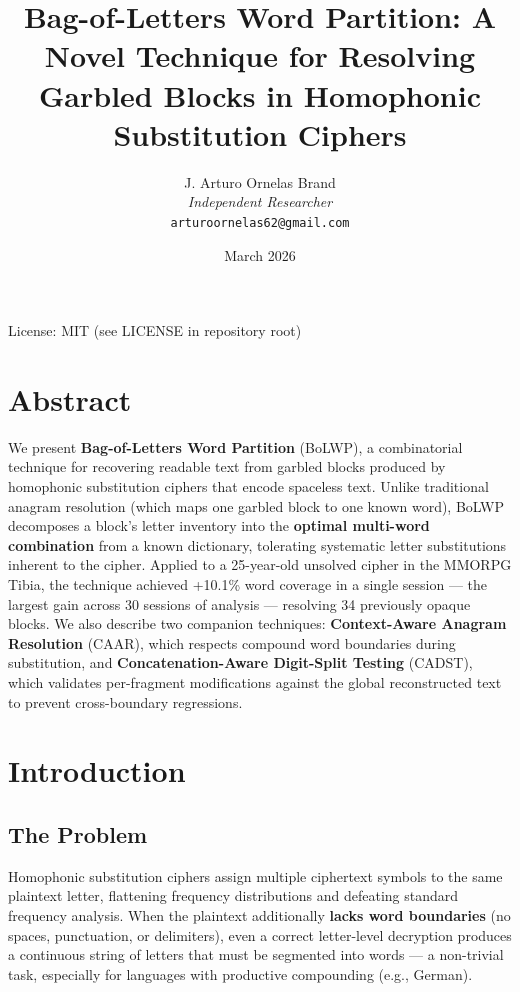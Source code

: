 \documentclass[11pt,a4paper]{article}
\title{Bag-of-Letters Word Partition: A Novel Technique for Resolving Garbled Blocks in Homophonic Substitution Ciphers}
\author{
    J. Arturo Ornelas Brand \\
    \textit{Independent Researcher} \\
    \texttt{arturoornelas62@gmail.com}
}
\date{March 2026}
\begin{document}
\maketitle

\begin{center}
License: MIT (see LICENSE in repository root)
\end{center}

\tableofcontents
\newpage

\section{Abstract}

We present \textbf{Bag-of-Letters Word Partition} (BoLWP), a combinatorial technique for recovering readable text from garbled blocks produced by homophonic substitution ciphers that encode spaceless text. Unlike traditional anagram resolution (which maps one garbled block to one known word), BoLWP decomposes a block's letter inventory into the \textbf{optimal multi-word combination} from a known dictionary, tolerating systematic letter substitutions inherent to the cipher. Applied to a 25-year-old unsolved cipher in the MMORPG Tibia, the technique achieved +10.1\% word coverage in a single session --- the largest gain across 30 sessions of analysis --- resolving 34 previously opaque blocks. We also describe two companion techniques: \textbf{Context-Aware Anagram Resolution} (CAAR), which respects compound word boundaries during substitution, and \textbf{Concatenation-Aware Digit-Split Testing} (CADST), which validates per-fragment modifications against the global reconstructed text to prevent cross-boundary regressions.

\section{Introduction}

\subsection{The Problem}

Homophonic substitution ciphers assign multiple ciphertext symbols to the same plaintext letter, flattening frequency distributions and defeating standard frequency analysis. When the plaintext additionally \textbf{lacks word boundaries} (no spaces, punctuation, or delimiters), even a correct letter-level decryption produces a continuous string of letters that must be segmented into words --- a non-trivial task, especially for languages with productive compounding (e.g., German).
\end{document}
